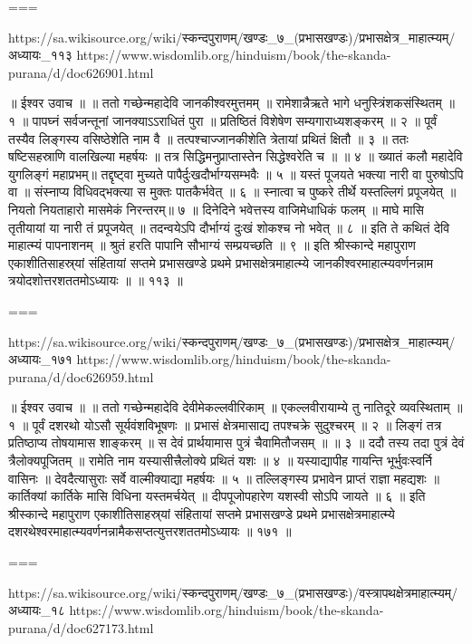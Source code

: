 ===

https://sa.wikisource.org/wiki/स्कन्दपुराणम्/खण्डः_७_(प्रभासखण्डः)/प्रभासक्षेत्र_माहात्म्यम्/अध्यायः_११३
https://www.wisdomlib.org/hinduism/book/the-skanda-purana/d/doc626901.html

॥ ईश्वर उवाच ॥ ॥
ततो गच्छेन्महादेवि जानकीश्वरमुत्तमम् ॥
रामेशान्नैऋते भागे धनुस्त्रिंशकसंस्थितम् ॥ १ ॥
पापघ्नं सर्वजन्तूनां जानक्याऽऽराधितं पुरा ॥
प्रतिष्ठितं विशेषेण सम्यगाराध्यशङ्करम् ॥ २ ॥
पूर्वं तस्यैव लिङ्गस्य वसिष्ठेशेति नाम वै ॥
तत्पश्चाज्जानकीशेति त्रेतायां प्रथितं क्षितौ ॥ ३ ॥
ततः षष्टिसहस्राणि वालखिल्या महर्षयः ॥
तत्र सिद्धिमनुप्राप्तास्तेन सिद्धेश्वरेति च ॥ ॥ ४ ॥
ख्यातं कलौ महादेवि युगलिङ्गं महाप्रभम्॥
तद्दृष्ट्वा मुच्यते पापैर्दुःखदौर्भाग्यसम्भवैः ॥ ५ ॥
यस्तं पूजयते भक्त्या नारी वा पुरुषोऽपि वा ॥
संस्नाप्य विधिवद्भक्त्या स मुक्तः पातकैर्भवेत् ॥ ६ ॥
स्नात्वा च पुष्करे तीर्थे यस्तल्लिगं प्रपूजयेत् ॥
नियतो नियताहारो मासमेकं निरन्तरम्॥ ७ ॥
दिनेदिने भवेत्तस्य वाजिमेधाधिकं फलम् ॥
माघे मासि तृतीयायां या नारी तं प्रपूजयेत् ॥
तदन्वयेऽपि दौर्भाग्यं दुःखं शोकश्च नो भवेत् ॥ ८ ॥
इति ते कथितं देवि माहात्म्यं पापनाशनम् ॥
श्रुतं हरति पापानि सौभाग्यं सम्प्रयच्छति ॥ ९ ॥
इति श्रीस्कान्दे महापुराण एकाशीतिसाहस्र्यां संहितायां सप्तमे प्रभासखण्डे प्रथमे प्रभासक्षेत्रमाहात्म्ये जानकीश्वरमाहात्म्यवर्णनन्नाम त्रयोदशोत्तरशततमोऽध्यायः ॥ ॥ ११३ ॥

===

https://sa.wikisource.org/wiki/स्कन्दपुराणम्/खण्डः_७_(प्रभासखण्डः)/प्रभासक्षेत्र_माहात्म्यम्/अध्यायः_१७१
https://www.wisdomlib.org/hinduism/book/the-skanda-purana/d/doc626959.html

॥ ईश्वर उवाच ॥ ॥
ततो गच्छेन्महादेवि देवीमेकल्लवीरिकाम् ॥
एकल्लवीरायाम्ये तु नातिदूरे व्यवस्थिताम् ॥ १ ॥
पूर्वं दशरथो योऽसौ सूर्यवंशविभूषणः ॥
प्रभासं क्षेत्रमासाद्य तपश्चक्रे सुदुश्चरम् ॥ २ ॥
लिङ्गं तत्र प्रतिष्ठाप्य तोषयामास शाङ्करम् ॥
स देवं प्रार्थयामास पुत्रं चैवामितौजसम् ॥ ॥ ३ ॥
ददौ तस्य तदा पुत्रं देवं त्रैलोक्यपूजितम् ॥
रामेति नाम यस्यासीत्त्रैलोक्ये प्रथितं यशः ॥ ४ ॥
यस्याद्यापीह गायन्ति भूर्भुवःस्वर्नि वासिनः ॥
देवदैत्यासुराः सर्वे वाल्मीक्याद्या महर्षयः ॥ ५ ॥
तल्लिङ्गस्य प्रभावेन प्राप्तं राज्ञा महद्यशः ॥
कार्तिक्यां कार्तिके मासि विधिना यस्तमर्चयेत् ॥
दीपपूजोपहारेण यशस्वी सोऽपि जायते ॥ ६ ॥
इति श्रीस्कान्दे महापुराण एकाशीतिसाहस्र्यां संहितायां सप्तमे प्रभासखण्डे प्रथमे प्रभासक्षेत्रमाहात्म्ये दशरथेश्वरमाहात्म्यवर्णनन्नामैकसप्तत्युत्तरशततमोऽध्यायः ॥ १७१ ॥

===

https://sa.wikisource.org/wiki/स्कन्दपुराणम्/खण्डः_७_(प्रभासखण्डः)/वस्त्रापथक्षेत्रमाहात्म्यम्/अध्यायः_१८
https://www.wisdomlib.org/hinduism/book/the-skanda-purana/d/doc627173.html

